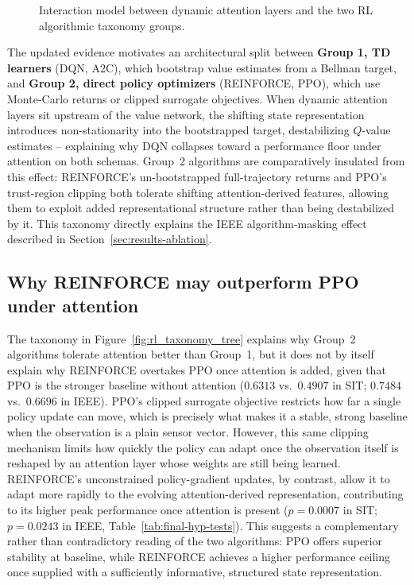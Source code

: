 \documentclass[12pt,oneside]{book}
\begin{document}
\begin{figure}[htbp]
{%
}
\caption{Interaction model between dynamic attention layers and the two RL algorithmic taxonomy groups.}
\label{fig:rl_attention_interaction}
\end{figure}

The updated evidence motivates an architectural split between \textbf{Group 1, TD learners} (\textsc{DQN}, \textsc{A2C}), which bootstrap value estimates from a Bellman target, and \textbf{Group 2, direct policy optimizers} (\textsc{REINFORCE}, \textsc{PPO}), which use Monte-Carlo returns or clipped surrogate objectives. When dynamic attention layers sit upstream of the value network, the shifting state representation introduces non-stationarity into the bootstrapped target, destabilizing $Q$-value estimates -- explaining why \textsc{DQN} collapses toward a performance floor under attention on both schemas. Group~2 algorithms are comparatively insulated from this effect: \textsc{REINFORCE}'s un-bootstrapped full-trajectory returns and \textsc{PPO}'s trust-region clipping both tolerate shifting attention-derived features, allowing them to exploit added representational structure rather than being destabilized by it. This taxonomy directly explains the IEEE algorithm-masking effect described in Section~\ref{sec:results-ablation}.

\subsection{Why \textsc{REINFORCE} may outperform \textsc{PPO} under attention}
The taxonomy in Figure~\ref{fig:rl_taxonomy_tree} explains why Group~2 algorithms tolerate attention better than Group~1, but it does not by itself explain why \textsc{REINFORCE} overtakes \textsc{PPO} once attention is added, given that \textsc{PPO} is the stronger baseline without attention ($0.6313$ vs.\ $0.4907$ in SIT; $0.7484$ vs.\ $0.6696$ in IEEE). \textsc{PPO}'s clipped surrogate objective restricts how far a single policy update can move, which is precisely what makes it a stable, strong baseline when the observation is a plain sensor vector. However, this same clipping mechanism limits how quickly the policy can adapt once the observation itself is reshaped by an attention layer whose weights are still being learned. \textsc{REINFORCE}'s unconstrained policy-gradient updates, by contrast, allow it to adapt more rapidly to the evolving attention-derived representation, contributing to its higher peak performance once attention is present ($p=0.0007$ in SIT; $p=0.0243$ in IEEE, Table~\ref{tab:final-hyp-tests}). This suggests a complementary rather than contradictory reading of the two algorithms: \textsc{PPO} offers superior stability at baseline, while \textsc{REINFORCE} achieves a higher performance ceiling once supplied with a sufficiently informative, structured state representation.
\end{document}
